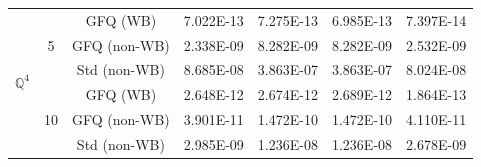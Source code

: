\documentclass[a4paper,10pt]{article}
\begin{document}
\begin{table}[htbp]
\begin{threeparttable}
\begin{tabular}{c|c|c| c|c|c|c}
			\multirow{6}{*}{$\mathbb{Q}^4$}
			& \multirow{3}{*}{5}
			& GFQ (WB)          & 7.022E-13 & 7.275E-13 & 6.985E-13 & 7.397E-14 \\
			& & GFQ (non-WB)       & 2.338E-09 & 8.282E-09 & 8.282E-09 & 2.532E-09 \\
			& & Std (non-WB) & 8.685E-08 & 3.863E-07 & 3.863E-07 & 8.024E-08 \\
			\cmidrule(lr){2-7}
			& \multirow{3}{*}{10}
			& GFQ (WB)          & 2.648E-12 & 2.674E-12 & 2.689E-12 & 1.864E-13 \\
			& & GFQ (non-WB)       & 3.901E-11 & 1.472E-10 & 1.472E-10 & 4.110E-11 \\
			& & Std (non-WB) & 2.985E-09 & 1.236E-08 & 1.236E-08 & 2.678E-09 \\
			\bottomrule
		\end{tabular}
	\end{threeparttable}
\end{table}


\end{document}
